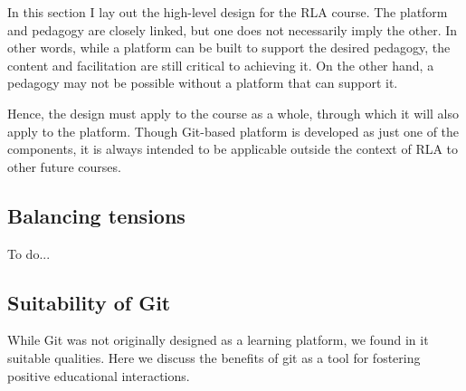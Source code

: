 \documentclass[12pt,twoside,vi]{mitthesis}
\newcommand{\wip}[1]{{\color{red} To do...}}
\begin{document}
In this section I lay out the high-level design for the RLA course. The platform and pedagogy are closely linked, but one does not necessarily imply the other. In other words, while a platform can be built to support the desired pedagogy, the content and facilitation are still critical to achieving it. On the other hand, a pedagogy may not be possible without a platform that can support it. 

Hence, the design must apply to the course as a whole, through which it will also apply to the platform. Though Git-based platform is developed as just one of the components, it is always intended to be applicable outside the context of RLA to other future courses.

\subsection{Balancing tensions}

\wip{We also aimed to foster a community that would extend into the later phases of the Accelerator. 

Finally, we rely on good software development practices and use popular tools where possible.

Communication. Communication lays the groundwork for the type of community formed. We aim to have instructors clearly communicate how to use the platform and be able to guide students throughout the course. We would like to allow natural and structured opportunities to ask questions and give feedback. General course information should be readily accessible to students.

Permissions. We will have to decide how to control authority to perform actions and visibility of content. On one hand, we believe that the platform should be as open as possible. This would allow students the opportunity to pursue their curiosities, to learn from each other's work, and to feel that they have a complete understanding of the platform. On the other hand, we would like to prevent either intentional or accidental actions that may destroy or hinder other participants' work. We also anticipate that sensitive topics would not be expressed without a private way of doing so and thus would like to allow for that.}

\subsection{Suitability of Git}

While Git was not originally designed as a learning platform, we found in it suitable qualities. Here we discuss the benefits of git as a tool for fostering positive educational interactions.
\end{document}
